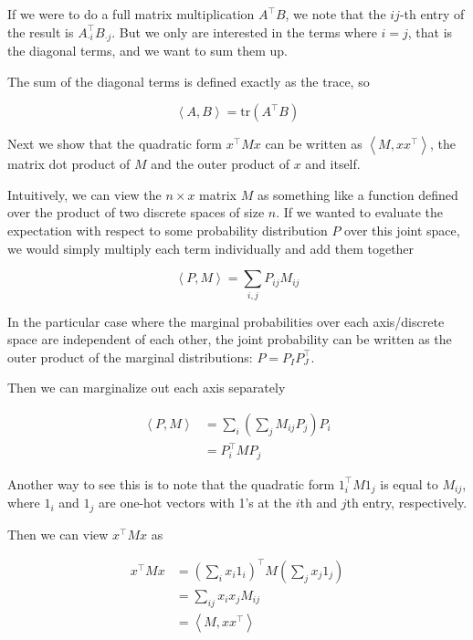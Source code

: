 \documentclass[a4paper]{article}
\begin{document}
  If we were to do a full matrix multiplication $ A^\intercal B $, we note that the $ij$-th entry of the result is $ A_{ \cdot i}^\intercal B_{ \cdot j}$. But we only are interested in the terms where $i = j$, that is the diagonal terms, and we want to sum them up.

  The sum of the diagonal terms is defined exactly as the trace, so

\begin{equation}
  \left< A, B \right> = 
    \text{tr} \left( A^\intercal B \right)
  \label{}
\end{equation}

Next we show that the quadratic form $ x^\intercal M x$ can be written as $ \left< M, x x^\intercal \right>$,  the matrix dot product of $M$ and the outer product of $x$ and itself. 

  Intuitively, we can view the $ n \times x $ matrix $M$ as something like a function defined over the product of two discrete spaces of size $n$. 
If we wanted to evaluate the expectation with respect to some probability distribution $P$ over this joint space, we would simply multiply each term individually and add them together

\begin{equation}
  \left< P, M \right> = \sum_{i,j} P_{ij} M_{ij}
  \label{}
\end{equation}

In the particular case where the marginal probabilities over each axis/discrete space are independent of each other, the joint probability can be written as the outer product of the marginal distributions: $ P = P_I P_J^\intercal$.

Then we can marginalize out each axis separately

\begin{equation}
  \begin{split}
    \left< P, M \right> &= 
      \sum_ i
        \left( 
	  \sum_j M_{ij} P_j
	\right)
	P_i \\
    &= P_i^\intercal M P_j
  \end{split}
  \label{}
\end{equation}

  Another way to see this is to note that the quadratic form $1_i^\intercal M 1_j$ is equal to $M_{ij}$, where $1_i$ and $1_j$ are one-hot vectors with 1's at the $i$th and $j$th entry, respectively.

  Then we can view $ x ^\intercal M x$ as

  \begin{equation}
    \begin{split}
      x^\intercal M x &=
        \left( \sum_i x_i 1_i \right)^\intercal
        M
        \left( \sum_j x_j 1_j \right) \\
	&= \sum_{ij} x_i x_j M_{ij} \\
	&= \left< M, x x^\intercal \right>
    \end{split}
    \label{}
  \end{equation}
\end{document}
